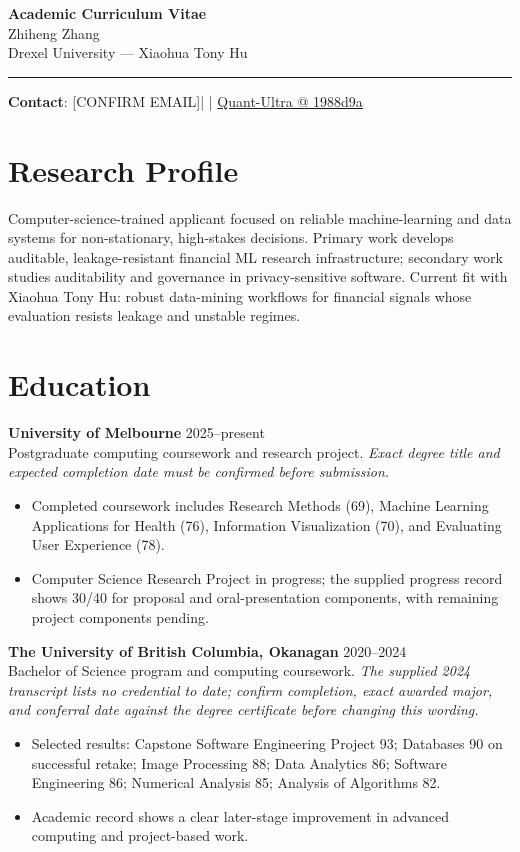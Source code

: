 \documentclass[11pt]{article}
\makeatletter
\newcommand{\ApplicantName}{Zhiheng Zhang}
\newcommand{\ApplicantEmail}{[CONFIRM EMAIL]}
\newcommand{\ApplicantPhone}{[CONFIRM PHONE]}
\newcommand{\ApplicantGitHub}{\href{https://github.com/zhiheng-zhang-Mera/Quant-Ultra/tree/1988d9a8530da91a8158de864d098ea869098923}{Quant-Ultra @ 1988d9a}}
\makeatother
\begin{document}
\begin{center}
{\LARGE\bfseries Academic Curriculum Vitae}\\[0.25em]
{\large \ApplicantName}\\
Drexel University --- Xiaohua Tony Hu
\end{center}
\vspace{0.35em}\hrule\vspace{0.65em}

\textbf{Contact}: \ApplicantEmail\quad | \quad \ApplicantPhone\quad | \quad \ApplicantGitHub

\section*{Research Profile}
Computer-science-trained applicant focused on reliable machine-learning and data systems for non-stationary, high-stakes decisions. Primary work develops auditable, leakage-resistant financial ML research infrastructure; secondary work studies auditability and governance in privacy-sensitive software. Current fit with Xiaohua Tony Hu: robust data-mining workflows for financial signals whose evaluation resists leakage and unstable regimes.

\section*{Education}
\textbf{University of Melbourne} \hfill 2025--present\\
Postgraduate computing coursework and research project. \textit{Exact degree title and expected completion date must be confirmed before submission.}
\begin{itemize}
\item Completed coursework includes Research Methods (69), Machine Learning Applications for Health (76), Information Visualization (70), and Evaluating User Experience (78).
\item Computer Science Research Project in progress; the supplied progress record shows 30/40 for proposal and oral-presentation components, with remaining project components pending.
\end{itemize}

\textbf{The University of British Columbia, Okanagan} \hfill 2020--2024\\
Bachelor of Science program and computing coursework. \textit{The supplied 2024 transcript lists no credential to date; confirm completion, exact awarded major, and conferral date against the degree certificate before changing this wording.}
\begin{itemize}
\item Selected results: Capstone Software Engineering Project 93; Databases 90 on successful retake; Image Processing 88; Data Analytics 86; Software Engineering 86; Numerical Analysis 85; Analysis of Algorithms 82.
\item Academic record shows a clear later-stage improvement in advanced computing and project-based work.
\end{itemize}
\end{document}
